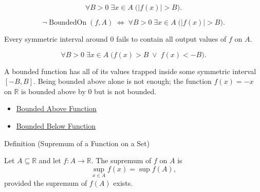 \begin{remark*}
\[
  \forall B>0\;\exists x\in A\;\bigl(|f(x)|>B\bigr).
\]
\end{remark*}

\begin{remark*}
\[
  \neg\operatorname{BoundedOn}(f,A)
  \;\Longleftrightarrow\;
  \forall B>0\;\exists x\in A\;\bigl(|f(x)|>B\bigr).
\]
\end{remark*}

\begin{remark*}
Every symmetric interval around $0$ fails to contain all output values of
$f$ on $A$.
\end{remark*}

\begin{remark*}
\[
  \forall B>0\;\exists x\in A\;
  \bigl(f(x)>B\;\vee\;f(x)<-B\bigr).
\]
\end{remark*}

\begin{remark*}[Interpretation]
A bounded function has all of its values trapped inside some symmetric
interval $[-B,B]$.  Being bounded above alone is not enough; the function
$f(x)=-x$ on $\mathbb{R}$ is bounded above by $0$ but is not bounded.
\end{remark*}

\begin{dependencies}
\begin{itemize}
  \item \hyperref[def:function-bounded-above]{Bounded Above Function}
  \item \hyperref[def:function-bounded-below]{Bounded Below Function}
\end{itemize}
\end{dependencies}


\begin{definitionbox}{Definition (Supremum of a Function on a Set)}
\begin{definition}
\label{def:function-supremum-on-set}
Let $A\subseteq\mathbb{R}$ and let $f:A\to\mathbb{R}$.  The supremum of
$f$ on $A$ is
\[
  \sup_{x\in A} f(x) = \sup f(A),
\]
provided the supremum of $f(A)$ exists.
\end{definition}
\end{definitionbox}

